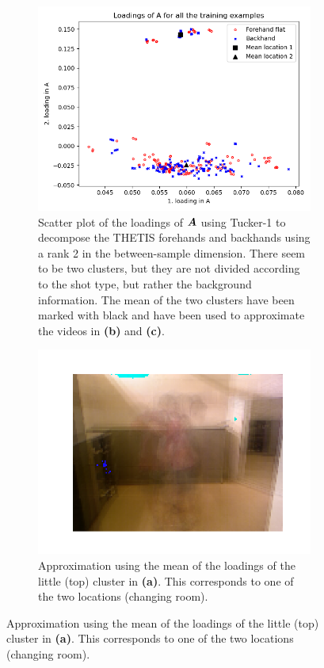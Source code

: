 \begin{figure}
    \centering
    \begin{subfigure}{\linewidth}
        \centering
        \includegraphics[width=0.64\linewidth]{Pics/06_results/scatter_loadings_THETIS.png}
        \captionsetup{width=.95\linewidth}
        \caption{Scatter plot of the loadings of $\boldsymbol{A}$ using Tucker-1 to decompose the THETIS forehands and backhands using a rank 2 in the between-sample dimension. There seem to be two clusters, but they are not divided according to the shot type, but rather the background information. The mean of the two clusters have been marked with black and have been used to approximate the videos in \textbf{(b)} and \textbf{(c)}.}
    \end{subfigure}
    \begin{subfigure}{.35\linewidth}
        \centering
        \captionsetup{width=.95\linewidth}
        \includegraphics[width=\linewidth]{Pics/06_results/loc1.png}
        \caption{Approximation using the mean of the loadings of the little (top) cluster in \textbf{(a)}. This corresponds to one of the two locations (changing room).}

\end{subfigure}
\end{figure}
